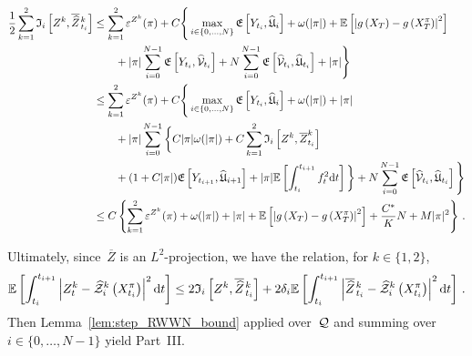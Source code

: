 \begin{small}
\begin{equation}
\begin{aligned}
\frac{1}{2} \sum_{k=1}^2 \mathfrak{I}_i\left[Z^k, \overline{\widehat{Z}}\kern0.1em^{k}_{t_i}\right]
& \leq \sum_{k=1}^2\varepsilon^{Z^k}(\pi) + C \Bigg\{\max _{i\in\{0, \dots, N\}} \mathfrak{E}\left[Y_{t_i}, \widehat{\mathfrak{U}}_{i}\right] + \omega(|\pi|) + \mathbb{E}\left[\left|g\left(X_T\right)-g\left(X^\pi_T\right)\right|^2\right] \\
& \qquad + |\pi| \sum_{i=0}^{N-1} \mathfrak{E}\left[Y_{t_i}, \widehat{\mathcal{V}}_{t_i}\right]
+ N \sum_{i=0}^{N-1} \mathfrak{E}\left[\widehat{\mathcal{V}}_{t_i}, \widehat{\mathfrak{U}}_{t_i}\right] + |\pi| \Bigg\}
\\
&\leq \sum_{k=1}^2\varepsilon^{Z^k}(\pi) + C\Bigg\{\max _{i\in\{0, \dots, N\}} \mathfrak{E}\left[Y_{t_i}, \widehat{\mathfrak{U}}_{i}\right] + \omega(|\pi|) + |\pi| \\
& \qquad + |\pi| \sum_{i=0}^{N-1}\bigg\{C|\pi|\omega(|\pi|) + C \sum_{k=1}^2\mathfrak{I}_i\left[Z^k, \overline{Z}^{k}_{t_i}\right] \\
& \qquad + (1+C|\pi|) \mathfrak{E}\left[Y_{t_{i+1}}, \widehat{\mathfrak{U}}_{i+1}\right] + |\pi| \mathbb{E}\left[\int_{t_i}^{t_{i+1}}f_{t}^2 \mathrm{d} t\right]\bigg\}
 + N \sum_{i=0}^{N-1} \mathfrak{E}\left[\widehat{\mathcal{V}}_{t_i}, \widehat{\mathfrak{U}}_{t_i}\right] \Bigg\} \\
&\leq C\left\{\sum_{k=1}^2\varepsilon^{Z^k}(\pi) + \omega(|\pi|)+|\pi|+\mathbb{E}\left[\left|g\left(X_T\right)-g\left(X^\pi_T\right)\right|^2\right] + \frac{C^{*}}{K}N + M|\pi|^2\right\}\,.\label{eq:convergence_part3_1}
\end{aligned}
\end{equation}
\end{small}%
Ultimately, since~$\overline{Z}$ is an $L^2$-projection, we have the relation, for $k\in\{1,2\}$,
\begin{equation}
\mathbb{E}\left[ \int_{t_i}^{t_{i+1}}\left|Z_t^k-\widehat{\mathcal{Z}}^k_i\left(X^\pi_{t_i}\right)\right|^2 \mathrm{d} t\right] \leq 2\mathfrak{I}_i\left[Z^k, \overline{\widehat{Z}}\kern0.1em^{k}_{t_i}\right] + 2\delta_{i}  \mathbb{E}\left[ \int_{t_i}^{t_{i+1}}\left|\overline{\widehat{Z}}\kern0.1em^{k}_{t_{i}}-\widehat{\mathcal{Z}}^k_i\left(X^\pi_{t_i}\right)\right|^2 \mathrm{d} t\right]\,.
\end{equation}
Then Lemma~\ref{lem:step_RWWN_bound} applied over~$\mathcal{Q}$ and summing over $i\in\{0,\dots,N-1\}$ yield Part~III.
